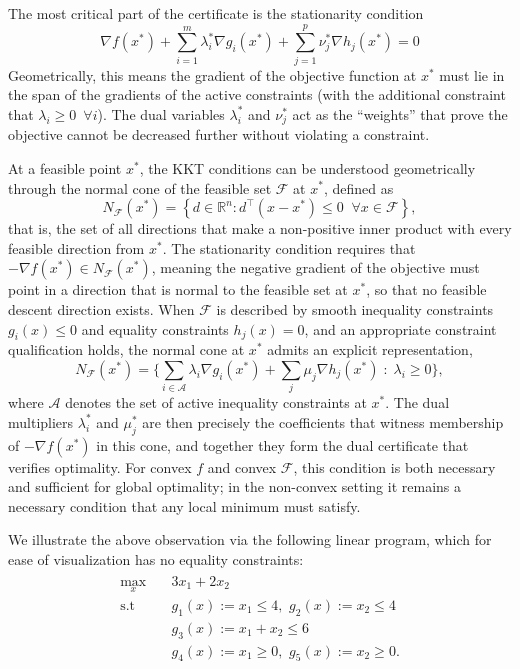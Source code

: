 The most critical part of the certificate is the stationarity condition
$$\nabla f(x^*) + \sum_{i=1}^m \lambda_i^* \nabla g_i(x^*) + \sum_{j=1}^p \nu_j^* \nabla h_j(x^*) = 0$$
Geometrically, this means the gradient of the objective function at $x^*$ must lie in the span of the gradients of the active constraints (with the additional constraint that $\lambda_i \ge 0 \enspace \forall i$). The dual variables $\lambda_i^*$ and $\nu_j^*$ act as the ``weights''  that prove the objective cannot be decreased further without violating a constraint.


At a feasible point $x^*$, the KKT conditions can be understood
geometrically through the normal cone of the feasible set $\mathcal{F}$ at $x^*$,
defined as
\begin{equation}
    N_{\mathcal{F}}(x^*) = \left\{ d \in \mathbb{R}^n : d^\top (x - x^*) \leq 0 
    \;\; \forall x \in \mathcal{F} \right\},
\end{equation}
that is, the set of all directions that make a non-positive inner product with every
feasible direction from $x^*$. The stationarity condition requires that $-\nabla
f(x^*) \in N_{\mathcal{F}}(x^*)$, meaning the negative gradient of the objective must
point in a direction that is normal to the feasible set at $x^*$, so that no feasible
descent direction exists. When $\mathcal{F}$ is described by smooth inequality
constraints $g_i(x) \leq 0$ and equality constraints $h_j(x) = 0$, and an appropriate
constraint qualification holds, the normal cone at $x^*$ admits an explicit
representation,
\begin{equation}\label{eq:normalcone}
    N_{\mathcal{F}}(x^*) = \Big\{ \sum_{i \in \mathcal{A}} \lambda_i \nabla g_i(x^*) 
    + \sum_j \mu_j \nabla h_j(x^*) \;:\; \lambda_i \geq 0 \Big\},
\end{equation}
where $\mathcal{A}$ denotes the set of active inequality constraints at $x^*$. The dual
multipliers $\lambda_i^*$ and $\mu_j^*$ are then precisely the coefficients that
witness membership of $-\nabla f(x^*)$ in this cone, and together they form the dual
certificate that verifies optimality. For convex $f$ and convex $\mathcal{F}$, this
condition is both necessary and sufficient for global optimality; in the non-convex
setting it remains a necessary condition that any local minimum must satisfy.

We illustrate the above observation via the following linear program, which for ease of visualization has no equality constraints:
\begin{align}\label{eq:kkt_example}
\begin{split}
  \max_x & \quad 3x_1 + 2x_2 \\  
  \text{s.t} & \quad g_1(x):=x_1 \le 4,\,\, g_2(x):=x_2 \le 4  \\
  & \quad g_3(x):=x_1+x_2 \le 6 \\
  & \quad g_4(x):=x_1 \ge 0, \,\, g_5(x):=x_2 \ge 0.
\end{split}    
\end{align}

